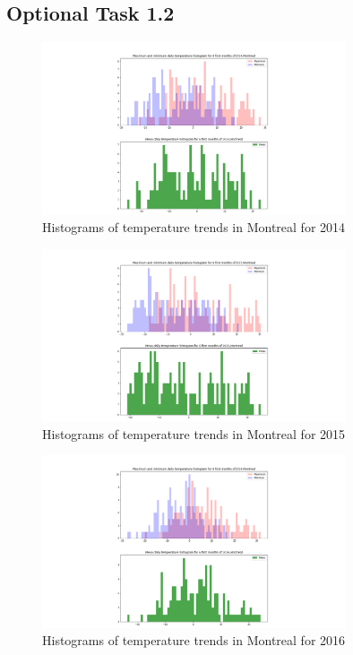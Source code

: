 \documentclass[12pt]{article}
\begin{document}
\pagebreak

\subsection{Optional Task 1.2}
\begin{figure}[!htbp]
\centering
\includegraphics[width=0.8\textwidth]{./docs/histogram2014.png} 
\caption{\scriptsize Histograms of temperature trends in Montreal for 2014}
\label{hist2014}		  
\end{figure}

\begin{figure}[!htbp]
\centering
\includegraphics[width=0.8\textwidth]{./docs/histogram2015.png} 
\caption{\scriptsize Histograms of temperature trends in Montreal for 2015}
\label{hist2015}		  
\end{figure}

\begin{figure}[!htbp]
\centering
\includegraphics[width=0.8\textwidth]{./docs/histogram2016.png} 
\caption{\scriptsize Histograms of temperature trends in Montreal for 2016}
\label{hist2016}		  
\end{figure}
\end{document}
